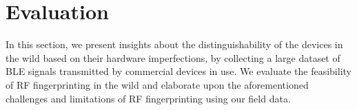 \section{Evaluation}
\label{sec:results}

In this section, we present insights about the distinguishability of the devices in the wild based on their hardware imperfections, by collecting a large dataset of BLE signals transmitted by commercial devices in use. We evaluate the feasibility of RF fingerprinting in the wild and elaborate upon the aforementioned challenges and limitations of RF fingerprinting using our field data.






